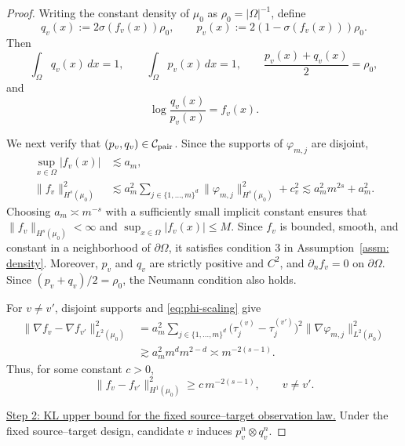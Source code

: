\documentclass[11pt]{article}
\theoremstyle{plain}
\theoremstyle{definition}
\theoremstyle{remark}
\newcommand{\proofstep}[1]{\par\medskip\noindent\uline{#1}}
\begin{document}
\begin{proof}
Writing the constant density of \(\mu_0\) as \(\rho_0=|\Omega|^{-1}\), define
\[
  q_v(x):=2\sigma(f_v(x))\rho_0,
  \qquad
  p_v(x):=2(1-\sigma(f_v(x)))\rho_0.
\]
Then
\[
  \int_\Omega q_v(x)\,dx=1,\qquad
  \int_\Omega p_v(x)\,dx=1,\qquad
  \frac{p_v(x)+q_v(x)}2=\rho_0,
\]
and
\[
  \log\frac{q_v(x)}{p_v(x)}=f_v(x).
\]

We next verify that \((p_v,q_v)\in\mathcal C_{\rm pair}\). Since the supports of
\(\varphi_{m,j}\) are disjoint,
\begin{align}
  \sup_{x\in\Omega}|f_v(x)|
  &\lesssim a_m, \label{eq:Linf-fk}\\
  \|f_v\|_{H^s(\mu_0)}^2
  &\lesssim
  a_m^2\sum_{j\in\{1,\dots,m\}^d}
  \|\varphi_{m,j}\|_{H^s(\mu_0)}^2+c_v^2
  \lesssim a_m^2m^{2s}+a_m^2. \label{eq:Hs-fk}
\end{align}
Choosing \(a_m\asymp m^{-s}\) with a sufficiently small implicit constant
ensures that \(\|f_v\|_{H^s(\mu_0)}<\infty\) and
\(\sup_{x\in\Omega}|f_v(x)|\le M\). Since \(f_v\) is bounded, smooth, and
constant in a neighborhood of \(\partial\Omega\), it satisfies condition 3 in
Assumption~\ref{assm: density}. Moreover, \(p_v\) and \(q_v\) are strictly
positive and \(C^2\), and \(\partial_n f_v=0\) on \(\partial\Omega\). Since
\((p_v+q_v)/2=\rho_0\), the Neumann condition also holds.

For \(v\neq v'\), disjoint supports and \eqref{eq:phi-scaling} give
\begin{align*}
  \|\nabla f_v-\nabla f_{v'}\|_{L^2(\mu_0)}^2
  &=
  a_m^2
  \sum_{j\in\{1,\dots,m\}^d}
  \big(\tau_j^{(v)}-\tau_j^{(v')}\big)^2
  \|\nabla\varphi_{m,j}\|_{L^2(\mu_0)}^2 \\
  &\gtrsim
  a_m^2 m^d m^{2-d}
  \asymp m^{-2(s-1)}.
\end{align*}
Thus, for some constant \(c>0\),
\begin{equation}\label{eq:H1-separation-correct}
  \|f_v-f_{v'}\|_{H^1(\mu_0)}^2
  \ge c\,m^{-2(s-1)},
  \qquad v\neq v'.
\end{equation}

\proofstep{Step 2: KL upper bound for the fixed source--target observation law.}
Under the fixed source--target design, candidate \(v\) induces
\(p_v^n\otimes q_v^n\).


\end{proof}
\end{document}
